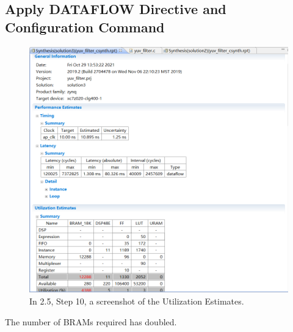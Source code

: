 \documentclass[a4paper]{article}
\begin{document}
\subsection{Apply DATAFLOW Directive and Configuration Command}

\begin{figure}[H]
    \centering
    \includegraphics[width=1\textwidth]{5.png}
    \caption{In 2.5, Step 10, a screenshot of the Utilization Estimates.}
\end{figure}
The number of BRAMs required has doubled.
\end{document}
